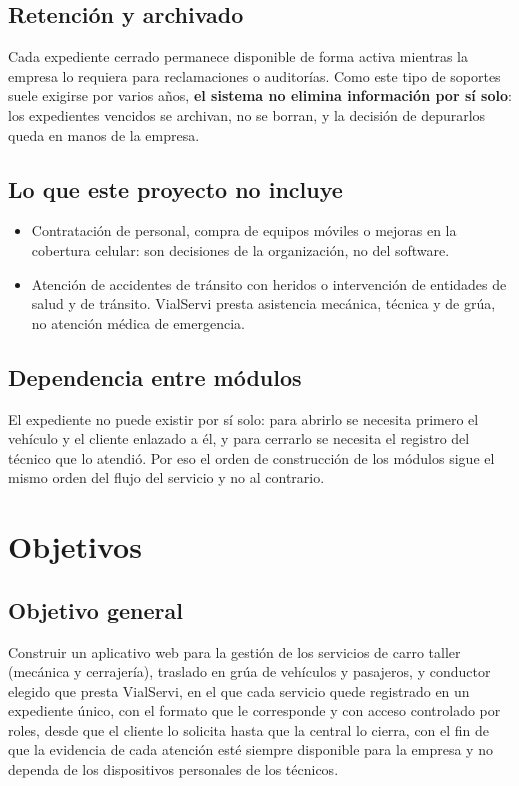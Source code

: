 \subsection{Retención y archivado}

Cada expediente cerrado permanece disponible de forma activa mientras la empresa
lo requiera para reclamaciones o auditorías. Como este tipo de soportes suele
exigirse por varios años, \textbf{el sistema no elimina información por sí solo}:
los expedientes vencidos se archivan, no se borran, y la decisión de depurarlos
queda en manos de la empresa.

\subsection{Lo que este proyecto no incluye}

\begin{itemize}
  \item Contratación de personal, compra de equipos móviles o mejoras en la
        cobertura celular: son decisiones de la organización, no del software.
  \item Atención de accidentes de tránsito con heridos o intervención de entidades
        de salud y de tránsito. VialServi presta asistencia mecánica, técnica y de
        grúa, no atención médica de emergencia.
\end{itemize}

\subsection{Dependencia entre módulos}

El expediente no puede existir por sí solo: para abrirlo se necesita primero el
vehículo y el cliente enlazado a él, y para cerrarlo se necesita el registro del
técnico que lo atendió. Por eso el orden de construcción de los módulos sigue el
mismo orden del flujo del servicio y no al contrario.

\section{Objetivos}

\subsection{Objetivo general}

Construir un aplicativo web para la gestión de los servicios de carro taller (mecánica y cerrajería), traslado
en grúa de vehículos y pasajeros, y conductor elegido que presta VialServi, en el
que cada servicio quede registrado en un expediente único, con el formato que le
corresponde y con acceso controlado por roles, desde que el cliente lo solicita
hasta que la central lo cierra, con el fin de que la evidencia de cada atención
esté siempre disponible para la empresa y no dependa de los dispositivos
personales de los técnicos.

